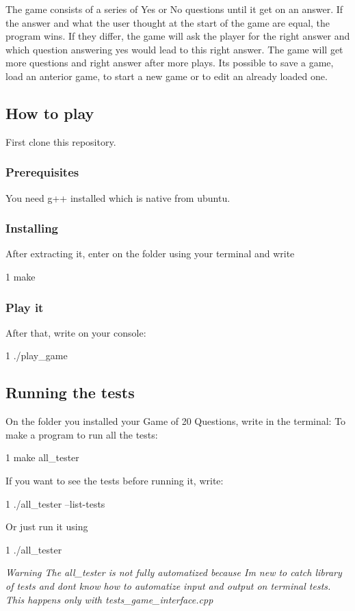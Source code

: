 The game consists of a series of Yes or No questions until it get on an answer. If the answer and what the user thought at the start of the game are equal, the program wins. If they differ, the game will ask the player for the right answer and which question answering yes would lead to this right answer. The game will get more questions and right answer after more plays. It\textquotesingle{}s possible to save a game, load an anterior game, to start a new game or to edit an already loaded one.

\subsection*{How to play}

First clone this repository.

\subsubsection*{Prerequisites}

You need g++ installed which is native from ubuntu.

\subsubsection*{Installing}

After extracting it, enter on the folder using your terminal and write 
\begin{DoxyCode}
1 make
\end{DoxyCode}


\subsubsection*{Play it}

After that, write on your console\+: 
\begin{DoxyCode}
1 ./play\_game
\end{DoxyCode}


\subsection*{Running the tests}

On the folder you installed your Game of 20 Questions, write in the terminal\+: To make a program to run all the tests\+: 
\begin{DoxyCode}
1 make all\_tester
\end{DoxyCode}
 If you want to see the tests before running it, write\+: 
\begin{DoxyCode}
1 ./all\_tester --list-tests
\end{DoxyCode}
 Or just run it using 
\begin{DoxyCode}
1 ./all\_tester 
\end{DoxyCode}
 {\itshape Warning The all\+\_\+tester is not fully automatized because I\textquotesingle{}m new to catch library of tests and don\textquotesingle{}t know how to automatize input and output on terminal tests. This happens only with tests\+\_\+game\+\_\+interface.\+cpp}


